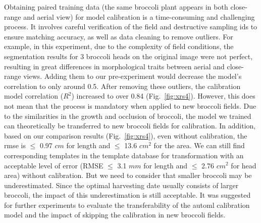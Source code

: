 Obtaining paired training data (the same broccoli plant appears in both close-range and aerial view) for model calibration is a time-consuming and challenging process. It involves careful verification of the field and destructive sampling ids to ensure matching accuracy, as well as data cleaning to remove outliers. For example, in this experiment, due to the complexity of field conditions, the segmentation results for 3 broccoli heads on the original image were not perfect, resulting in great differences in morphological traits between aerial and close-range views. Adding them to our pre-experiment would decrease the model's correlation to only around 0.5. After removing these outliers, the calibration model correlation ($R^2$) increased to over 0.84 (Fig.~\ref{fig:xrs4}). However, this does not mean that the process is mandatory when applied to new broccoli fields. Due to the similarities in the growth and occlusion of broccoli, the model we trained can theoretically be transferred to new broccoli fields for calibration. In addition, based on our comparison results (Fig.~\ref{fig:xrs4}), even without calibration, the \gls{rmse} is $\leq$ 0.97 $cm$ for length and $\leq$ 13.6 $cm^2$ for the area.  We can still find corresponding templates in the template database for transformation with an acceptable level of error (RMSE $\leq$ 3.1 $mm$ for length and $\leq$ 2.76 $cm^2$ for head area) without calibration. But we need to consider that smaller broccoli may be underestimated. Since the optimal harvesting date usually consists of larger broccoli, the impact of this underestimation is still acceptable. It was suggested for further experiments to evaluate the transferability of the \gls{automl} calibration model and the impact of skipping the calibration in new broccoli fields.

